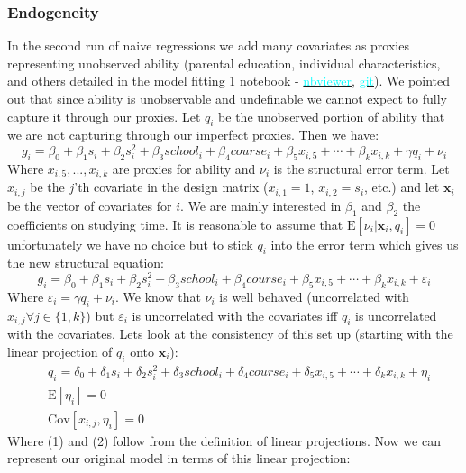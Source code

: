 \documentclass[12pt]{article}
\newcommand{\E}{\mathrm{E}}
\newcommand{\Cov}{\mathrm{Cov}}
\begin{document}
\subsubsection{Endogeneity} \label{endogeneity}
In the second run of naive regressions we add many covariates as proxies representing unobserved ability (parental education, individual characteristics, and others detailed in the model fitting 1 notebook - \href{https://nbviewer.jupyter.org/github/nadavtadelis/Reproducible_Metrics/blob/master/model_fitting_1.ipynb}{\textcolor{cyan}{nbviewer}}, \href{https://github.com/nadavtadelis/Reproducible_Metrics/blob/master/model_fitting_1.ipynb}{\textcolor{cyan}{git}}). We pointed out that since ability is unobservable and undefinable we cannot expect to fully capture it through our proxies. Let $q_i$ be the unobserved portion of ability that we are not capturing through our imperfect proxies. Then we have:
$$
g_i = \beta_0 + \beta_1 s_i + \beta_2 s_i^2 + \beta_3 school_i + \beta_4 course_i + \beta_5 x_{i,5} + \cdots + \beta_k x_{i,k} + \gamma q_i + \nu_i
$$
Where $x_{i,5}, ..., x_{i,k}$ are proxies for ability and $\nu_i$ is the structural error term. Let $x_{i,j}$ be the $j$'th covariate in the design matrix ($x_{i,1} = 1$, $x_{i,2} = s_i$, etc.) and let $\bm{x}_i$ be the vector of covariates for $i$. We are mainly interested in $\beta_1$ and $\beta_2$ the coefficients on studying time. It is reasonable to assume that $\E[\nu_i | \bm{x}_i, q_i] = 0$ unfortunately we have no choice but to stick $q_i$ into the error term which gives us the new structural equation:
$$
g_i = \beta_0 + \beta_1 s_i + \beta_2 s_i^2 + \beta_3 school_i + \beta_4 course_i + \beta_5 x_{i,5} + \cdots + \beta_k x_{i,k} + \varepsilon_i
$$
Where $\varepsilon_i = \gamma q_i + \nu_i$. We know that $\nu_i$ is well behaved (uncorrelated with $x_{i,j} \forall j \in \{1,k\}$) but $\varepsilon_i$ is uncorrelated with the covariates iff $q_i$ is uncorrelated with the covariates. Lets look at the consistency of this set up (starting with the linear projection of $q_i$ onto $\bm{x}_i$):
\begin{align}
&q_i = \delta_0 + \delta_1 s_i + \delta_2 s_i^2 + \delta_3 school_i + \delta_4 course_i + \delta_5 x_{i,5} + \cdots + \delta_k x_{i,k} + \eta_i  \nonumber \\
&\E[\eta_i] = 0 \\
&\Cov[x_{i,j}, \eta_i] = 0
\end{align}
Where (1) and (2) follow from the definition of linear projections. Now we can represent our original model in terms of this linear projection:
\end{document}
